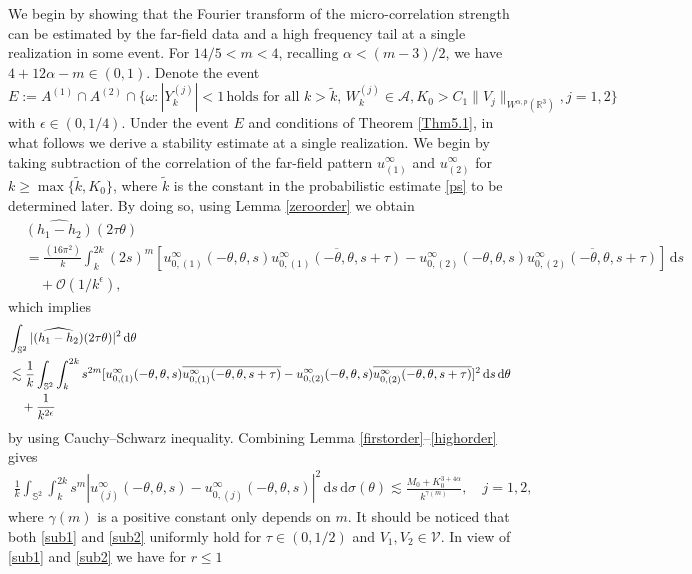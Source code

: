 \documentclass[reqno, 12pt]{amsart}
\numberwithin{equation}{section}
\begin{document}
We begin by showing that the Fourier transform of the micro-correlation strength can be estimated by the far-field data and a high frequency tail
at a single realization in some event. 
For $14/5<m<4$, recalling $\alpha<(m-3)/2$, we have $4+12\alpha-m \in (0,1)$.
Denote the event
\begin{equation}\label{event}
	E:=A^{(1)} \cap A^{(2)}\cap\{\omega:|Y_k^{(j)}| < 1 \,\text{holds for all }k>\tilde k, \, W_k^{(j)} \in \mathcal A, K_0 > C_1\|V_j\|_{W^{\alpha,p}(\mathbb R^3)}, j=1,2\}\end{equation}
with $\epsilon \in (0,1/4)$.
Under the event $E$ and conditions of Theorem \ref{Thm5.1}, in what follows
	we derive a stability estimate at a single realization.
	We begin by taking subtraction of the correlation of the far-field pattern $u^\infty_{(1)}$ and $u^\infty_{(2)}$ for $k \ge \max \{\tilde k, K_0\}$, where $\tilde k$ is the constant in the probabilistic estimate \eqref{ps} to be determined later.
By doing so, using Lemma \ref{zeroorder} we obtain
\begin{align*}&\widehat{(h_1-h_2)}(2\tau\theta) \\ &=\frac{(16\pi^2)}{k}\int_k^{2k}(2s)^{m} [u_{0,(1)}^\infty(-\theta,\theta, s) \overline{u_{0,(1)}^\infty(-\theta,\theta, s+\tau)}-u_{0,(2)}^\infty(-\theta,\theta, s) \overline{u_{0,(2)}^\infty(-\theta,\theta, s+\tau)}]\,\mathrm{d}s \\ 
&\quad+\mathcal{O}(1/k^\epsilon),\end{align*} which implies   \begin{align}
&\int_{\mathbb S^2}|\widehat{(h_1-h_2)}(2\tau\theta)|^2\,\mathrm{d}\theta \notag\\ & \lesssim \frac{1}{k}\int_{\mathbb S^2}\int_k^{2k}s^{2m} [u_{0,(1)}^\infty(-\theta,\theta, s) \overline{u_{0,(1)}^\infty(-\theta,\theta, s+\tau)}-u_{0,(2)}^\infty(-\theta,\theta, s) \overline{u_{0,(2)}^\infty(-\theta,\theta, s+\tau)}]^2\,\mathrm{d}s\,\mathrm{d}\theta \notag\\ 
&\quad+\frac{1}{k^{2\epsilon}} \label{sub1}
\end{align} by using Cauchy--Schwarz inequality. Combining Lemma \ref{firstorder}--\ref{highorder} gives \begin{align}\label{sub2}
    \frac{1}{k}\int_{\mathbb S^2}\int_k^{2k}s^m|u_{(j)}^\infty(-\theta,\theta,s)-u_{0,(j)}^\infty(-\theta,\theta,s)|^2\,\mathrm{d}s\,\mathrm{d}\sigma(\theta) \lesssim  \frac{M_0+K_0^{3+4\alpha}}{k^{\gamma(m)}}, \quad j=1,2,
\end{align} where $\gamma(m)$ is a positive constant only depends on $m.$ It should be noticed that both \eqref{sub1} and \eqref{sub2} uniformly hold for $\tau \in (0,1/2)$ and $V_1,V_2 \in \mathcal V.$ In view of \eqref{sub1} and \eqref{sub2} we have for $r\leq 1$
\end{document}

